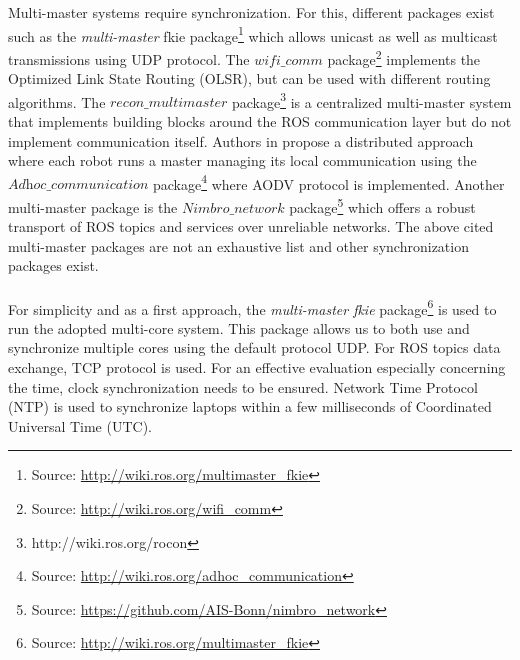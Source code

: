 \documentclass[11pt,openany]{book}
\begin{document}
Multi-master systems require synchronization. For this, diﬀerent packages exist such as the \textit{multi-master} fkie package\footnote{Source: \url{http://wiki.ros.org/multimaster_fkie}} which allows unicast as well as multicast transmissions using UDP protocol. The $\textit{wifi\_comm}$ package\footnote{Source: \url{http://wiki.ros.org/wifi_comm}} implements the Optimized Link State Routing (OLSR), but can be used with diﬀerent routing algorithms. The $\textit{recon\_multimaster}$ package\footnote{http://wiki.ros.org/rocon} is a centralized multi-master system that implements building blocks around the ROS communication layer but do not implement communication itself. Authors in \cite{andre2014coordinated} propose a distributed approach where each robot runs a master managing its local communication using the $\textit{Adhoc\_communication}$ package\footnote{Source: \url{http://wiki.ros.org/adhoc_communication}} where AODV protocol is implemented. Another multi-master package is the $\textit{Nimbro\_network}$ package\footnote{Source: \url{https://github.com/AIS-Bonn/nimbro_network}} which oﬀers a robust transport of ROS topics and services over unreliable networks. The above cited multi-master packages are not an exhaustive list and other synchronization packages exist.\\\\
For simplicity and as a ﬁrst approach, the \textit{multi-master fkie} package\footnote{Source: \url{http://wiki.ros.org/multimaster_fkie}} is used to run the adopted multi-core system. This package allows us to both use and synchronize multiple cores using the default protocol UDP. For ROS topics data exchange, TCP protocol is used. For an eﬀective evaluation especially concerning the time, clock synchronization needs to be ensured. Network Time Protocol (NTP) is used to synchronize laptops within a few milliseconds of Coordinated Universal Time (UTC).
\end{document}
